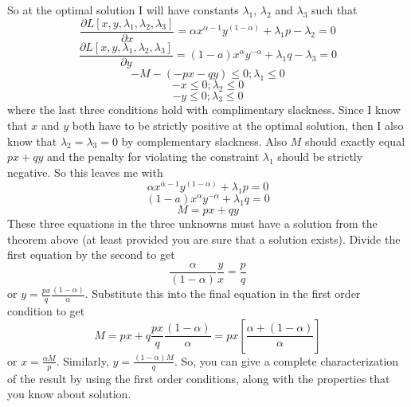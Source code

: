\documentclass{article}
\begin{document}
So at the optimal solution I will have constants $\lambda_{1}$, $\lambda_{2}$
and $\lambda_{3}$ such that%
\[
\frac{\partial L\left[  x,y,\lambda_{1},\lambda_{2},\lambda_{3}\right]
}{\partial x}=\alpha x^{\alpha-1}y^{\left(  1-\alpha\right)  }+\lambda
_{1}p-\lambda_{2}=0
\]%
\[
\frac{\partial L\left[  x,y,\lambda_{1},\lambda_{2},\lambda_{3}\right]
}{\partial y}=\left(  1-a\right)  x^{\alpha}y^{-\alpha}+\lambda_{1}%
q-\lambda_{3}=0
\]%
\[
-M-\left(  -px-qy\right)  \leq0;\lambda_{1}\leq0
\]%
\[
-x\leq0;\lambda_{2}\leq0
\]%
\[
-y\leq0;\lambda_{3}\leq0
\]
where the last three conditions hold with complimentary slackness. Since I
know that $x$ and $y$ both have to be strictly positive at the optimal
solution, then I also know that $\lambda_{2}=\lambda_{3}=0$ by complementary
slackness. Also $M$ should exactly equal $px+qy$ and the penalty for violating
the constraint $\lambda_{1}$ should be strictly negative. So this leaves me
with%
\[
\alpha x^{\alpha-1}y^{\left(  1-\alpha\right)  }+\lambda_{1}p=0
\]%
\[
\left(  1-a\right)  x^{\alpha}y^{-\alpha}+\lambda_{1}q=0
\]%
\[
M=px+qy
\]
These three equations in the three unknowns must have a solution from the
theorem above (at least provided you are sure that a solution exists). Divide
the first equation by the second to get%
\[
\frac{\alpha}{\left(  1-\alpha\right)  }\frac{y}{x}=\frac{p}{q}%
\]
or $y=\frac{px}{q}\frac{\left(  1-\alpha\right)  }{\alpha}$. Substitute this
into the final equation in the first order condition to get%
\[
M=px+q\frac{px}{q}\frac{\left(  1-\alpha\right)  }{\alpha}=px\left[
\frac{\alpha+\left(  1-\alpha\right)  }{\alpha}\right]
\]
or $x=\frac{\alpha M}{p}$. Similarly, $y=\frac{(1-\alpha) M}{q}$. So, you can give a
complete characterization of the result by using the first order conditions, along with the properties that you know about solution. 
\end{document}
